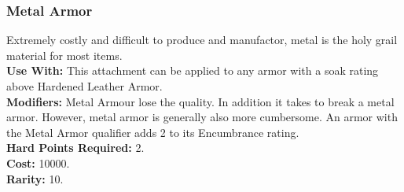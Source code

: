 \subsubsection{Metal Armor}
Extremely costly and difficult to produce and manufactor, metal is the holy grail
material for most items.\\
\textbf{Use With:} This attachment can be applied to any armor with a soak rating above Hardened Leather Armor.\\
\textbf{Modifiers:} Metal Armour lose the  quality.
    In addition it takes \despair\despair to break a metal armor.
    However, metal armor is generally also more cumbersome. An armor with the Metal
    Armor qualifier adds 2 to its Encumbrance rating.\\
\textbf{Hard Points Required:} 2.\\
\textbf{Cost:} 10000.\\
\textbf{Rarity:} 10.\\
